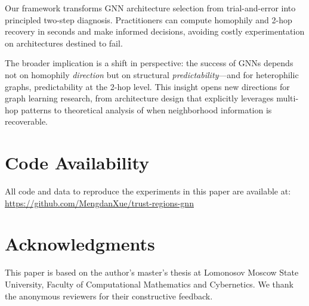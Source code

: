 Our framework transforms GNN architecture selection from trial-and-error into principled two-step diagnosis. Practitioners can compute homophily and 2-hop recovery in seconds and make informed decisions, avoiding costly experimentation on architectures destined to fail.

The broader implication is a shift in perspective: the success of GNNs depends not on homophily \textit{direction} but on structural \textit{predictability}---and for heterophilic graphs, predictability at the 2-hop level. This insight opens new directions for graph learning research, from architecture design that explicitly leverages multi-hop patterns to theoretical analysis of when neighborhood information is recoverable.

\section*{Code Availability}

All code and data to reproduce the experiments in this paper are available at: \url{https://github.com/MengdanXue/trust-regions-gnn}

\section*{Acknowledgments}

This paper is based on the author's master's thesis at Lomonosov Moscow State University, Faculty of Computational Mathematics and Cybernetics. We thank the anonymous reviewers for their constructive feedback.

